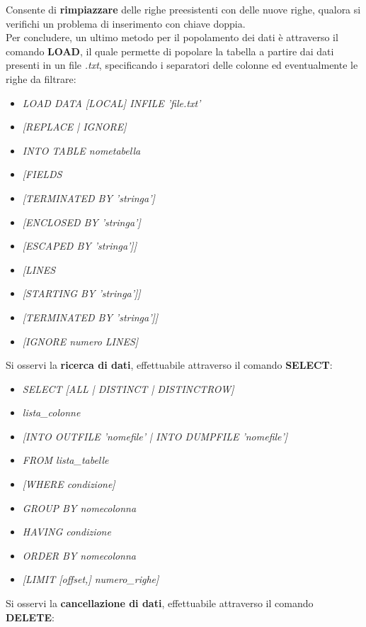 \documentclass{article}
\begin{document}
Consente di \textbf{rimpiazzare} delle righe preesistenti con delle nuove righe, qualora si verifichi un problema di inserimento con chiave doppia.\\
Per concludere, un ultimo metodo per il popolamento dei dati è attraverso il comando \textbf{LOAD}, il quale permette di popolare la tabella a partire dai dati presenti in un file \textit{.txt}, specificando i separatori delle colonne ed eventualmente le righe da filtrare:
\begin{itemize}[label={ }, leftmargin=1cm]
    \item \textit{LOAD DATA [LOCAL] INFILE 'file.txt'}
    \item \textit{[REPLACE | IGNORE]}
    \item \textit{INTO TABLE nometabella}
    \item \textit{[FIELDS}
    \item \textit{[TERMINATED BY 'stringa']}
    \item \textit{[ENCLOSED BY 'stringa']}
    \item \textit{[ESCAPED BY 'stringa']]}
    \item \textit{[LINES}
    \item \textit{[STARTING BY 'stringa']]}
    \item \textit{[TERMINATED BY 'stringa']]}
    \item \textit{[IGNORE numero LINES]}\\
\end{itemize}
Si osservi la \textbf{ricerca di dati}, effettuabile attraverso il comando \textbf{SELECT}:
\begin{itemize}[label={ }, leftmargin=1cm]
    \item \textit{SELECT [ALL | DISTINCT | DISTINCTROW]}
    \item \textit{lista\_colonne}
    \item \textit{[INTO OUTFILE 'nomefile' | INTO DUMPFILE 'nomefile']}
    \item \textit{FROM lista\_tabelle}
    \item \textit{[WHERE condizione]}
    \item \textit{GROUP BY {nomecolonna}}
    \item \textit{HAVING condizione}
    \item \textit{ORDER BY {nomecolonna}}
    \item \textit{[LIMIT [offset,] numero\_righe]}
\end{itemize}
Si osservi la \textbf{cancellazione di dati}, effettuabile attraverso il comando \textbf{DELETE}:
\end{document}
